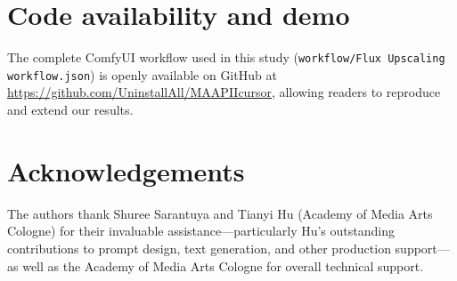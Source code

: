 \documentclass[sigconf,nonacm]{acmart}
\newif\ifanonymous
\begin{document}
\section*{Code availability and demo}
The complete ComfyUI workflow used in this study (\texttt{workflow/Flux Upscaling workflow.json}) is openly available on GitHub at \url{https://github.com/UninstallAll/MAAPIIcursor}, allowing readers to reproduce and extend our results.


\ifanonymous
  \section*{Acknowledgements}
  Acknowledgments have been removed for anonymous review and will be restored in the camera-ready version.
\else
    \section*{Acknowledgements}
    The authors thank Shuree Sarantuya and Tianyi Hu (Academy of Media Arts Cologne) for their invaluable assistance—particularly Hu's outstanding contributions to prompt design, text generation, and other production support—as well as the Academy of Media Arts Cologne for overall technical support.
\fi

\end{document}
